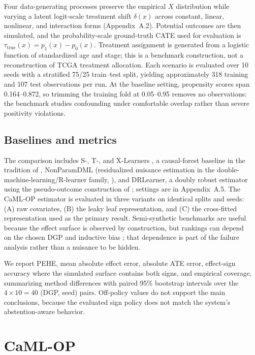 \documentclass{article}
\begin{document}
Four data-generating processes preserve the empirical $X$ distribution while varying a latent logit-scale treatment shift $\delta(x)$ across constant, linear, nonlinear, and interaction forms (Appendix~A.2). Potential outcomes are then simulated, and the probability-scale ground-truth CATE used for evaluation is $\tau_{\mathrm{true}}(x)=p_1(x)-p_0(x)$. Treatment assignment is generated from a logistic function of standardized age and stage; this is a benchmark construction, not a reconstruction of TCGA treatment allocation. Each scenario is evaluated over 10 seeds with a stratified 75/25 train--test split, yielding approximately 318 training and 107 test observations per run. At the baseline setting, propensity scores span 0.164--0.872, so trimming the training fold at 0.05--0.95 removes no observations: the benchmark studies confounding under comfortable overlap rather than severe positivity violations.

\subsection{Baselines and metrics}
The comparison includes S-, T-, and X-Learners \citep{kunzel2019}, a causal-forest baseline in the tradition of \citet{wager2018}, NonParamDML (residualized nuisance estimation in the double-machine-learning/R-learner family, \citealp{chernozhukov2018,nie2021}), and DRLearner, a doubly robust estimator using the pseudo-outcome construction of \citet{kennedy2023}; settings are in Appendix~A.5. The CaML-OP estimator is evaluated in three variants on identical splits and seeds: (A) raw covariates, (B) the leaky leaf representation, and (C) the cross-fitted representation used as the primary result. Semi-synthetic benchmarks are useful because the effect surface is observed by construction, but rankings can depend on the chosen DGP and inductive bias \citep{curth2021}; that dependence is part of the failure analysis rather than a nuisance to be hidden.

We report PEHE, mean absolute effect error, absolute ATE error, effect-sign accuracy where the simulated surface contains both signs, and empirical coverage, summarizing method differences with paired 95\% bootstrap intervals over the $4\times10=40$ (DGP, seed) pairs. Off-policy values do not support the main conclusions, because the evaluated sign policy does not match the system's abstention-aware behavior.

\section{CaML-OP}
\end{document}
